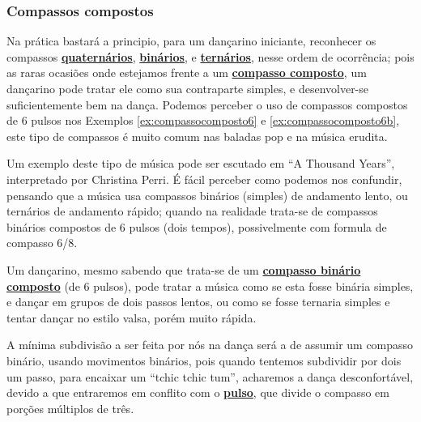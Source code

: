 \subsubsection{Compassos compostos}
Na prática bastará a principio, para um dançarino iniciante,
reconhecer os compassos \hyperref[subsec:compassoquaternario]{\textbf{quaternários}}, 
\hyperref[subsec:compassobinario]{\textbf{binários}}, e 
\hyperref[subsec:compassoternario]{\textbf{ternários}},
nesse ordem de ocorrência;
pois as raras ocasiões onde estejamos frente a um \hyperref[sec:compaso]{\textbf{compasso composto}},
um dançarino pode tratar ele como sua contraparte simples,
e desenvolver-se suficientemente bem na dança. 
Podemos perceber o uso de compassos compostos de 6 pulsos nos Exemplos \ref{ex:compassocomposto6}
e \ref{ex:compassocomposto6b},
este tipo de compassos é muito comum nas baladas pop e na música erudita.
\begin{example}
\label{ex:compassocomposto6}
Um exemplo deste tipo de música pode ser escutado em ``A Thousand Years'', 
interpretado por Christina Perri. É fácil perceber como podemos nos confundir,
pensando que a música usa compassos binários (simples) de andamento lento,
ou ternários de andamento rápido; quando na realidade trata-se de compassos binários compostos de 6 pulsos (dois tempos),
possivelmente com formula de compasso 6/8.

Um dançarino, mesmo sabendo que trata-se de um \hyperref[compasso:binario]{\textbf{compasso binário composto}} (de 6 pulsos),
pode tratar a música como se esta fosse binária simples, e dançar em grupos de dois passos lentos,
ou como se fosse ternaria simples e tentar dançar no estilo valsa, porém muito rápida.

A mínima subdivisão a ser feita por nós na dança  
será a de assumir um compasso binário, usando movimentos binários,
pois quando tentemos subdividir por dois um passo, para encaixar um ``tchic tchic tum'',
acharemos a dança desconfortável, devido a que
entraremos em conflito com o \hyperref[ref:Pulso]{\textbf{pulso}}, 
que divide o compasso em porções múltiplos de três.
  
\end{example}

